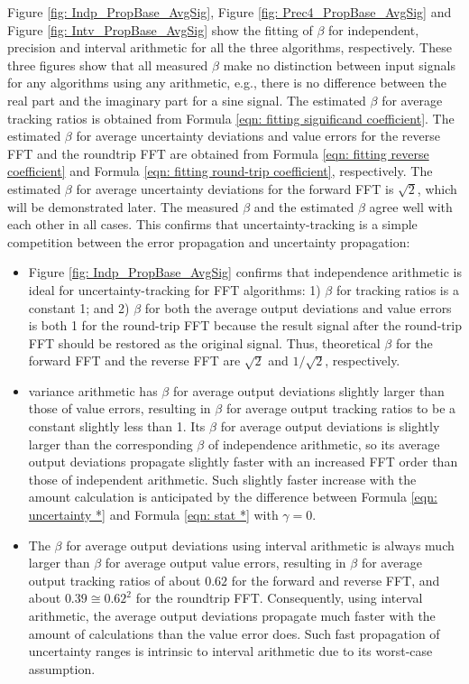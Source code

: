 \documentclass[twoside]{article}
\numberwithin{equation}{section}
\begin{document}
Figure \ref{fig: Indp_PropBase_AvgSig}, Figure \ref{fig: Prec4_PropBase_AvgSig} and Figure \ref{fig: Intv_PropBase_AvgSig} show the fitting of $\beta$ for independent, precision and interval arithmetic for all the three algorithms, respectively.  These three figures show that all measured $\beta$ make no distinction between input signals for any algorithms using any arithmetic, e.g., there is no difference between the real part and the imaginary part for a sine signal.  The estimated $\beta$ for average tracking ratios is obtained from Formula \eqref{eqn: fitting significand coefficient}.  The estimated $\beta$ for average uncertainty deviations and value errors for the reverse FFT and the roundtrip FFT are obtained from Formula \eqref{eqn: fitting reverse coefficient} and Formula \eqref{eqn: fitting round-trip coefficient}, respectively.  The estimated $\beta$ for average uncertainty deviations for the forward FFT is $\sqrt{2}$, which will be demonstrated later.  The measured $\beta$ and the estimated $\beta$ agree well with each other in all cases.  This confirms that uncertainty-tracking is a simple competition between the error propagation and uncertainty propagation:
\begin{itemize}
\item  Figure \ref{fig: Indp_PropBase_AvgSig} confirms that independence arithmetic is ideal for uncertainty-tracking for FFT algorithms: 1) $\beta$ for tracking ratios is a constant 1; and 2) $\beta$ for both the average output deviations and value errors is both 1 for the round-trip FFT because the result signal after the round-trip FFT should be restored as the original signal.  Thus, theoretical $\beta$ for the forward FFT and the reverse FFT are $\sqrt{2}$ and $1/\sqrt{2}$, respectively.

\item  variance arithmetic has $\beta$ for average output deviations slightly larger than those of value errors, resulting in $\beta$ for average output tracking ratios to be a constant slightly less than 1.  Its $\beta$ for average output deviations is slightly larger than the corresponding $\beta$ of independence arithmetic, so its average output deviations propagate slightly faster with an increased FFT order than those of independent arithmetic.  Such slightly faster increase with the amount calculation is anticipated by the difference between Formula \eqref{eqn: uncertainty *} and Formula \eqref{eqn: stat *}  with $\gamma=0$.

\item  The $\beta$ for average output deviations using interval arithmetic is always much larger than $\beta$ for average output value errors, resulting in $\beta$ for average output tracking ratios of about $0.62$ for the forward and reverse FFT, and about $0.39  \cong {0.62}^{2}$ for the roundtrip FFT.  Consequently, using interval arithmetic, the average output deviations propagate much faster with the amount of calculations than the value error does.  Such fast propagation of uncertainty ranges is intrinsic to interval arithmetic due to its worst-case assumption.  
\end{itemize}
\end{document}
